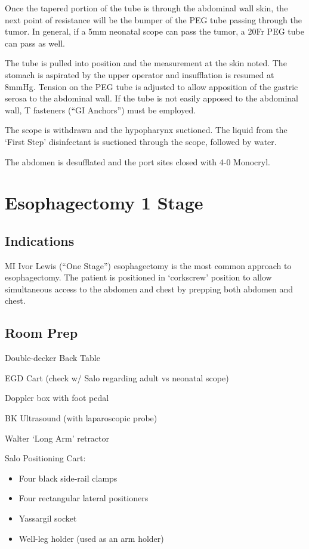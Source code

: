 \documentclass[
]{book}
\providecommand{\tightlist}{%
  \setlength{\itemsep}{0pt}\setlength{\parskip}{0pt}}
\begin{document}
Once the tapered portion of the tube is through the abdominal wall skin, the next point of resistance will be the bumper of the PEG tube passing through the tumor. In general, if a 5mm neonatal scope can pass the tumor, a 20Fr PEG tube can pass as well.

The tube is pulled into position and the measurement at the skin noted. The stomach is aspirated by the upper operator and insufflation is resumed at 8mmHg. Tension on the PEG tube is adjusted to allow apposition of the gastric serosa to the abdominal wall. If the tube is not easily apposed to the abdominal wall, T fasteners (``GI Anchors'') must be employed.

The scope is withdrawn and the hypopharynx suctioned. The liquid from the `First Step' disinfectant is suctioned through the scope, followed by water.

The abdomen is desufflated and the port sites closed with 4-0 Monocryl.

\hypertarget{esophagectomy-1-stage}{%
\chapter{Esophagectomy 1 Stage}\label{esophagectomy-1-stage}}

\hypertarget{indications}{%
\section{Indications}\label{indications}}

MI Ivor Lewis (``One Stage'') esophagectomy is the most common approach to esophagectomy. The patient is positioned in `corkscrew' position to allow simultaneous access to the abdomen and chest by prepping both abdomen and chest.

\hypertarget{room-prep}{%
\section{Room Prep}\label{room-prep}}

Double-decker Back Table

EGD Cart (check w/ Salo regarding adult vs neonatal scope)

Doppler box with foot pedal

BK Ultrasound (with laparoscopic probe)

Walter `Long Arm' retractor

Salo Positioning Cart:

\begin{itemize}
\tightlist
\item
  Four black side-rail clamps
\item
  Four rectangular lateral positioners
\item
  Yassargil socket
\item
  Well-leg holder (used as an arm holder)
\end{itemize}
\end{document}
